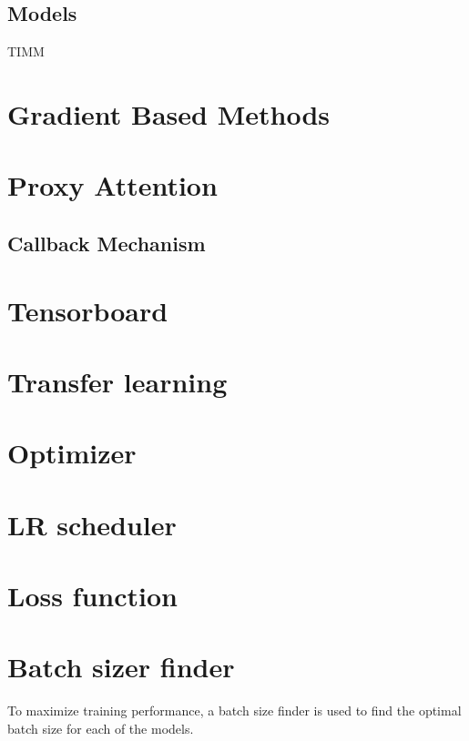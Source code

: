 \subsection{Models}
TIMM

\section{Gradient Based Methods}
\section{Proxy Attention}



\subsection{Callback Mechanism}
\section{Tensorboard}
\section{Transfer learning}
\section{Optimizer}
\section{LR scheduler}
\section{Loss function}
\section{Batch sizer finder}
To maximize training performance, a batch size finder is used to find the optimal batch size for each of the models. 

